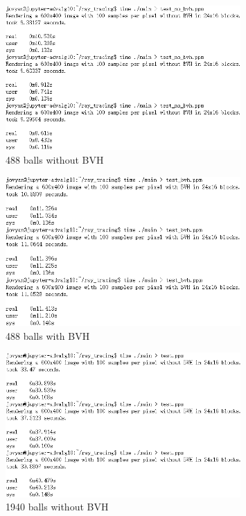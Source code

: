 \documentclass[UTF8, a4paper, 11pt]{article}
\begin{document}
\begin{figure}[H]
    \centering
    \includegraphics[width=0.8\textwidth]{488_no_bvh.png}
    \caption{488 balls without BVH}
\end{figure}
\begin{figure}[H]
    \centering
    \includegraphics[width=0.8\textwidth]{488_bvh.png}
    \caption{488 balls with BVH}
\end{figure}
\begin{figure}[H]
    \centering
    \includegraphics[width=0.8\textwidth]{1940_no_bvh.png}
    \caption{1940 balls without BVH}
\end{figure}
\end{document}
